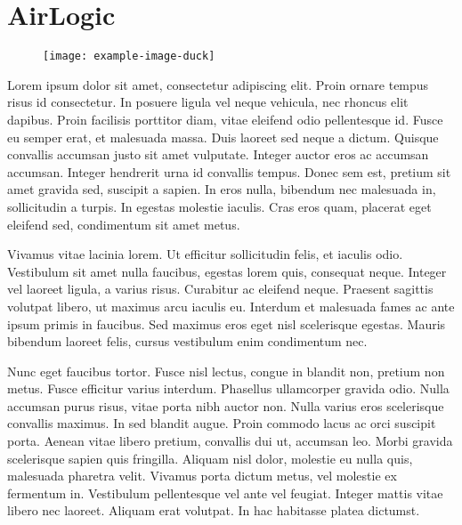 \chapter{AirLogic} \label{ch:airlogic}
  \begin{figure}[h]
    \centering
    \texttt{[image: example-image-duck]}
  \end{figure}


  Lorem ipsum dolor sit amet, consectetur adipiscing elit. Proin ornare tempus
  risus id consectetur. In posuere ligula vel neque vehicula, nec rhoncus elit
  dapibus. Proin facilisis porttitor diam, vitae eleifend odio pellentesque id.
  Fusce eu semper erat, et malesuada massa. Duis laoreet sed neque a dictum.
  Quisque convallis accumsan justo sit amet vulputate. Integer auctor eros ac
  accumsan accumsan. Integer hendrerit urna id convallis tempus. Donec sem est,
  pretium sit amet gravida sed, suscipit a sapien. In eros nulla, bibendum nec
  malesuada in, sollicitudin a turpis. In egestas molestie iaculis. Cras eros
  quam, placerat eget eleifend sed, condimentum sit amet metus.

  Vivamus vitae lacinia lorem. Ut efficitur sollicitudin felis, et iaculis odio.
  Vestibulum sit amet nulla faucibus, egestas lorem quis, consequat neque.
  Integer vel laoreet ligula, a varius risus. Curabitur ac eleifend neque.
  Praesent sagittis volutpat libero, ut maximus arcu iaculis eu. Interdum et
  malesuada fames ac ante ipsum primis in faucibus. Sed maximus eros eget nisl
  scelerisque egestas. Mauris bibendum laoreet felis, cursus vestibulum enim
  condimentum nec.

  Nunc eget faucibus tortor. Fusce nisl lectus, congue in blandit non, pretium
  non metus. Fusce efficitur varius interdum. Phasellus ullamcorper gravida
  odio. Nulla accumsan purus risus, vitae porta nibh auctor non. Nulla varius
  eros scelerisque convallis maximus. In sed blandit augue. Proin commodo lacus
  ac orci suscipit porta. Aenean vitae libero pretium, convallis dui ut,
  accumsan leo. Morbi gravida scelerisque sapien quis fringilla. Aliquam nisl
  dolor, molestie eu nulla quis, malesuada pharetra velit. Vivamus porta dictum
  metus, vel molestie ex fermentum in. Vestibulum pellentesque vel ante vel
  feugiat. Integer mattis vitae libero nec laoreet. Aliquam erat volutpat. In
  hac habitasse platea dictumst.

  \newpage

